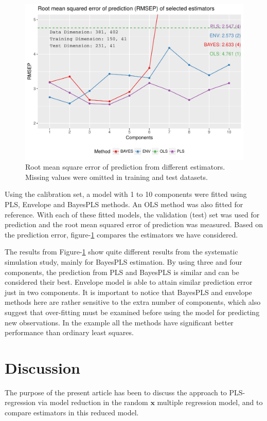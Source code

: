 \documentclass[num-refs]{wiley-article}
\begin{document}
\begin{figure}[!ht]
  \centering
  \includegraphics[width=0.9\linewidth]{prediction-plot-150-train}
  \caption{Root mean square error of prediction from different estimators.
    Missing values were omitted in training and test datasets.}
  \label{fig:ex-2}
\end{figure}

Using the calibration set, a model with 1 to 10 components were fitted using PLS, Envelope and BayesPLS methods. An OLS method was also fitted for reference. With each of these fitted models, the validation (test) set was used for prediction and the root mean squared error of prediction was measured. Based on the prediction error, figure-\ref{fig:ex-2} compares the estimators we have considered. 

The results from Figure-\ref{fig:ex-2} show quite different results from the systematic simulation study, mainly for BayesPLS estimation. By using three and four components, the prediction from PLS and BayesPLS is similar and can be considered their best. Envelope model is able to attain similar prediction error just in two components. It is important to notice that BayesPLS and envelope methods here are rather sensitive to the extra number of components, which also suggest that over-fitting must be examined before using the model for predicting new observations. In the example all the methods have significant better performance than ordinary least squares.

\section{Discussion}

The purpose of the present article has been to discuss the approach to PLS-regression via model reduction in the random $\bm{x}$ multiple regression model, and to compare estimators in this reduced model.
\end{document}
